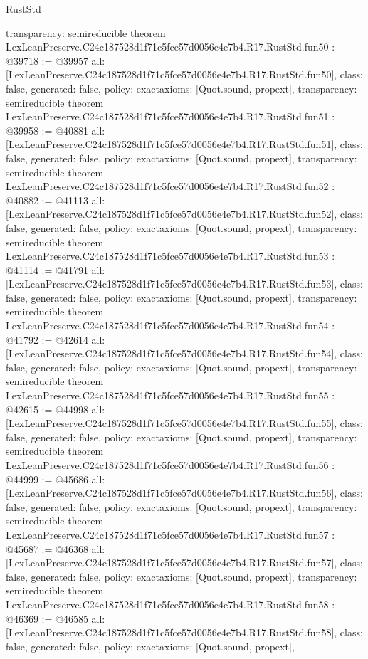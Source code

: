 \begin{lexlean}{RustStd}
\begin{coremodule}
{  transparency: semireducible
}
theorem LexLeanPreserve.C24c187528d1f71c5fce57d0056e4e7b4.R17.RustStd.fun50 : @39718 := @39957 {
  all: [LexLeanPreserve.C24c187528d1f71c5fce57d0056e4e7b4.R17.RustStd.fun50],
  class: false,
  generated: false,
  policy: exact{axioms: [Quot.sound, propext]},
  transparency: semireducible
}
theorem LexLeanPreserve.C24c187528d1f71c5fce57d0056e4e7b4.R17.RustStd.fun51 : @39958 := @40881 {
  all: [LexLeanPreserve.C24c187528d1f71c5fce57d0056e4e7b4.R17.RustStd.fun51],
  class: false,
  generated: false,
  policy: exact{axioms: [Quot.sound, propext]},
  transparency: semireducible
}
theorem LexLeanPreserve.C24c187528d1f71c5fce57d0056e4e7b4.R17.RustStd.fun52 : @40882 := @41113 {
  all: [LexLeanPreserve.C24c187528d1f71c5fce57d0056e4e7b4.R17.RustStd.fun52],
  class: false,
  generated: false,
  policy: exact{axioms: [Quot.sound, propext]},
  transparency: semireducible
}
theorem LexLeanPreserve.C24c187528d1f71c5fce57d0056e4e7b4.R17.RustStd.fun53 : @41114 := @41791 {
  all: [LexLeanPreserve.C24c187528d1f71c5fce57d0056e4e7b4.R17.RustStd.fun53],
  class: false,
  generated: false,
  policy: exact{axioms: [Quot.sound, propext]},
  transparency: semireducible
}
theorem LexLeanPreserve.C24c187528d1f71c5fce57d0056e4e7b4.R17.RustStd.fun54 : @41792 := @42614 {
  all: [LexLeanPreserve.C24c187528d1f71c5fce57d0056e4e7b4.R17.RustStd.fun54],
  class: false,
  generated: false,
  policy: exact{axioms: [Quot.sound, propext]},
  transparency: semireducible
}
theorem LexLeanPreserve.C24c187528d1f71c5fce57d0056e4e7b4.R17.RustStd.fun55 : @42615 := @44998 {
  all: [LexLeanPreserve.C24c187528d1f71c5fce57d0056e4e7b4.R17.RustStd.fun55],
  class: false,
  generated: false,
  policy: exact{axioms: [Quot.sound, propext]},
  transparency: semireducible
}
theorem LexLeanPreserve.C24c187528d1f71c5fce57d0056e4e7b4.R17.RustStd.fun56 : @44999 := @45686 {
  all: [LexLeanPreserve.C24c187528d1f71c5fce57d0056e4e7b4.R17.RustStd.fun56],
  class: false,
  generated: false,
  policy: exact{axioms: [Quot.sound, propext]},
  transparency: semireducible
}
theorem LexLeanPreserve.C24c187528d1f71c5fce57d0056e4e7b4.R17.RustStd.fun57 : @45687 := @46368 {
  all: [LexLeanPreserve.C24c187528d1f71c5fce57d0056e4e7b4.R17.RustStd.fun57],
  class: false,
  generated: false,
  policy: exact{axioms: [Quot.sound, propext]},
  transparency: semireducible
}
theorem LexLeanPreserve.C24c187528d1f71c5fce57d0056e4e7b4.R17.RustStd.fun58 : @46369 := @46585 {
  all: [LexLeanPreserve.C24c187528d1f71c5fce57d0056e4e7b4.R17.RustStd.fun58],
  class: false,
  generated: false,
  policy: exact{axioms: [Quot.sound, propext]},
}
\end{coremodule}
\end{lexlean}
